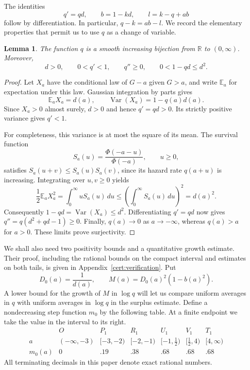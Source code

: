 \documentclass[11pt]{article}
\newtheorem{lemma}[theorem]{Lemma}
\theoremstyle{definition}
\theoremstyle{remark}
\numberwithin{equation}{section}
\begin{document}
The identities
\begin{equation}\label{tr:scalar-identities}
 q'=qd,\qquad b=1-kd,\qquad l=k-q+ab
\end{equation}
follow by differentiation.  In particular, $q-k=ab-l$.  We record the
elementary properties that permit us to use $q$ as a change of variable.

\begin{lemma}\label{tr:q-properties}
The function $q$ is a smooth increasing bijection from $\mathbb R$ to
$(0,\infty)$.  Moreover,
\[
 d>0,\qquad 0<q'<1,\qquad q''\ge0,
 \qquad 0<1-qd\le d^2.
\]
\end{lemma}
\begin{proof}
Let $X_a$ have the conditional law of $G-a$ given $G>a$, and write
$\mathbb E_a$ for expectation under this law.  Gaussian integration
by parts gives
\[
 \mathbb E_a X_a=d(a),\qquad
 \operatorname{Var}(X_a)=1-q(a)d(a).
\]
Since $X_a>0$ almost surely, $d>0$ and hence $q'=qd>0$.
Its strictly positive variance gives $q'<1$.

For completeness, this variance is at most the square of its mean.
The survival function
\[
 S_a(u)=\frac{\Phi(-a-u)}{\Phi(-a)},\qquad u\ge0,
\]
satisfies $S_a(u+v)\le S_a(u)S_a(v)$, since its hazard rate $q(a+u)$
is increasing.  Integrating over $u,v\ge0$ yields
\[
 \frac12\mathbb E_a X_a^2
 =\int_0^\infty uS_a(u)\,du
 \le\left(\int_0^\infty S_a(u)\,du\right)^2=d(a)^2.
\]
Consequently $1-qd=\operatorname{Var}(X_a)\le d^2$.  Differentiating
$q'=qd$ now gives
$q''=q(d^2+qd-1)\ge0$.  Finally, $q(a)\to0$ as $a\to-\infty$,
whereas $q(a)>a$ for $a>0$.  These limits prove surjectivity.
\end{proof}

We shall also need two positivity bounds and a quantitative growth estimate.
Their proof, including
the rational bounds on the compact interval and estimates on both tails,
is given in Appendix~\ref{cert:verification}.
Put
\begin{equation}\label{tr:M-definition}
 D_0(a)=\frac1{d(a)},\qquad M(a)=D_0(a)^2(1-b(a)^2).
\end{equation}
A lower bound for the growth of $M$ in $\log q$ will let us compare
uniform averages in $q$ with uniform averages in $\log q$ in the
surplus estimate.
Define a nondecreasing step function $m_0$ by the following table.  At a
finite endpoint we take the value in the interval to its right.
\begin{equation}\label{tr:bins}
\begin{array}{c|rrrrrr}
 &O&P_1&R_1&U_1&V_1&T_1\\\hline
 a&(-\infty,-3)&[-3,-2)&[-2,-1)&[-1,\tfrac12)&[\tfrac12,4)&[4,\infty)\\
 m_0(a)&0&.19&.38&.68&.68&.68
\end{array}
\end{equation}
All terminating decimals in this paper denote exact rational numbers.
\end{document}

